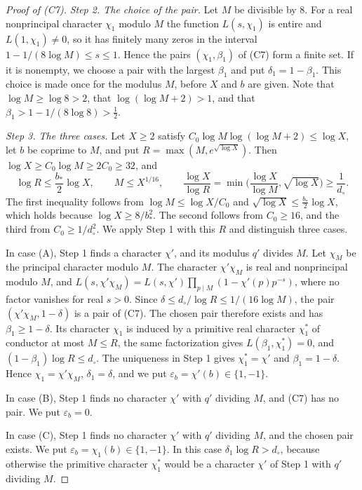 \begin{proof}[Proof of (C7)]
\emph{Step 2. The choice of the pair.} Let $M$ be divisible by $8$. For a real nonprincipal character $\chi_1$ modulo $M$ the function $L(s,\chi_1)$ is entire and $L(1,\chi_1)\ne0$, so it has finitely many zeros in the interval $1-1/(8\log M)\le s\le1$. Hence the pairs $(\chi_1,\beta_1)$ of (C7) form a finite set. If it is nonempty, we choose a pair with the largest $\beta_1$ and put $\delta_1=1-\beta_1$. This choice is made once for the modulus $M$, before $X$ and $b$ are given. Note that $\log M\ge\log8>2$, that $\log(\log M+2)>1$, and that $\beta_1>1-1/(8\log8)>\frac12$.

\emph{Step 3. The three cases.} Let $X\ge2$ satisfy $C_0\log M\log(\log M+2)\le\log X$, let $b$ be coprime to $M$, and put $R=\max(M,e^{\sqrt{\log X}})$. Then $\log X\ge C_0\log M\ge2C_0\ge32$, and
\begin{equation}\label{C7ranges}
\log R\le\frac{b_\ast}2\log X,\qquad M\le X^{1/16},\qquad \frac{\log X}{\log R}=\min\Big(\frac{\log X}{\log M},\sqrt{\log X}\Big)\ge\frac1{d_\circ}.
\end{equation}
The first inequality follows from $\log M\le\log X/C_0$ and $\sqrt{\log X}\le\frac{b_\ast}2\log X$, which holds because $\log X\ge8/b_\ast^2$. The second follows from $C_0\ge16$, and the third from $C_0\ge1/d_\circ^2$. We apply Step 1 with this $R$ and distinguish three cases.

In case (A), Step 1 finds a character $\chi'$, and its modulus $q'$ divides $M$. Let $\chi_M$ be the principal character modulo $M$. The character $\chi'\chi_M$ is real and nonprincipal modulo $M$, and $L(s,\chi'\chi_M)=L(s,\chi')\prod_{p\mid M}(1-\chi'(p)p^{-s})$, where no factor vanishes for real $s>0$. Since $\delta\le d_\circ/\log R\le1/(16\log M)$, the pair $(\chi'\chi_M,1-\delta)$ is a pair of (C7). The chosen pair therefore exists and has $\beta_1\ge1-\delta$. Its character $\chi_1$ is induced by a primitive real character $\chi_1^\ast$ of conductor at most $M\le R$, the same factorization gives $L(\beta_1,\chi_1^\ast)=0$, and $(1-\beta_1)\log R\le d_\circ$. The uniqueness in Step 1 gives $\chi_1^\ast=\chi'$ and $\beta_1=1-\delta$. Hence $\chi_1=\chi'\chi_M$, $\delta_1=\delta$, and we put $\varepsilon_b=\chi'(b)\in\{1,-1\}$.

In case (B), Step 1 finds no character $\chi'$ with $q'$ dividing $M$, and (C7) has no pair. We put $\varepsilon_b=0$.

In case (C), Step 1 finds no character $\chi'$ with $q'$ dividing $M$, and the chosen pair exists. We put $\varepsilon_b=\chi_1(b)\in\{1,-1\}$. In this case $\delta_1\log R>d_\circ$, because otherwise the primitive character $\chi_1^\ast$ would be a character $\chi'$ of Step 1 with $q'$ dividing $M$.


\end{proof}
